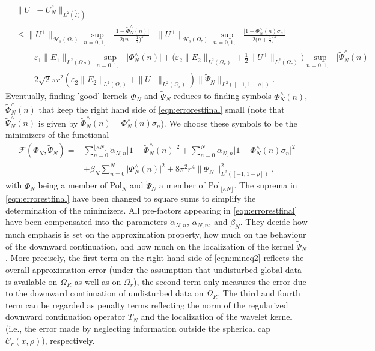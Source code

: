 \documentclass[a4paper, 10pt]{article}
\numberwithin{equation}{section}
\theoremstyle{definition}
\newcommand{\eps}{\ensuremath{\varepsilon}}
\begin{document}
\begin{align}
&\|U^+ - U_N^{\varepsilon}\|_{L^2(\tilde{\Gamma}_r)}\label{eqn:errorestfinal}
\\&\leq\|U^+\|_{\mathcal{H}_s(\Omega_r)}\sup_{n=0,1,\ldots}\frac{\big|1-\tilde{\Phi}_N^\wedge(n)\big|}{2\big(n+\frac{1}{2}\big)^s}+\|U^+\|_{\mathcal{H}_s(\Omega_r)}\sup_{n=0,1,\ldots}\frac{\big|1-{\Phi}_{N}^\wedge(n)\sigma_n\big|}{2\big(n+\frac{1}{2}\big)^s}\nonumber
\\&\quad+\varepsilon_1\|E_1\|_{L^2(\Omega_R)}\sup_{n=0,1,\ldots}\big|\Phi_{N}^\wedge(n)\big|
+\Big(\eps_2\|E_2\|_{L^2(\Omega_r)}+\frac{1}{2}\|U^+\|_{L^2(\Omega_r)}\Big)\sup_{n=0,1,\ldots}\big|\tilde{\Psi}_{N}^\wedge(n)\big|\nonumber
\\&\quad+2\sqrt{2}\pi r^2\left(\eps_2\|E_2\|_{L^2(\Omega_r)}+\|U^+\|_{L^2(\Omega_r)}\right)\big\|\tilde{\Psi}_{N}\big\|_{L^2([-1,1-\rho])}.\nonumber
\end{align}
Eventually, finding 'good' kernels $\Phi_N$ and $\tilde{\Psi}_N$ reduces to finding symbols $\Phi_N^\wedge(n)$, $\tilde{\Phi}_N^\wedge(n)$ that keep the right hand side of \eqref{eqn:errorestfinal} small (note that $\tilde{\Psi}_{N}^\wedge(n)$ is given by $\tilde{\Phi}_N^\wedge(n)-\Phi_N^\wedge(n)\sigma_n$). We choose these symbols to be the minimizers of the functional 
\begin{equation}\label{eqn:mineq2}
{\begin{aligned}
\mathcal{F}(\Phi_N,\tilde{\Psi}_N)=&\sum_{n=0}^{\lfloor\kappa N\rfloor}\tilde{\alpha}_{N,n}\big|1-\tilde{\Phi}_{N}^\wedge(n)\big|^2+\sum_{n=0}^{N}\alpha_{N,n}\big|1-{\Phi}_{N}^\wedge(n)\sigma_n\big|^2
\\&+\beta_N\sum_{n=0}^{N}\big|\Phi_N^\wedge(n)\big|^2+8\pi^2 r^4\big\|\tilde{\Psi}_N\big\|^2_{L^2([-1,1-\rho])},
\end{aligned}}
\end{equation}
with $\Phi_N$ being a member of Pol$_{N}$ and $\tilde{\Psi}_N$ a member of Pol$_{\lfloor\kappa N\rfloor}$. The suprema in \eqref{eqn:errorestfinal} have been changed to square sums to simplify the determination of the minimizers. All pre-factors appearing in \eqref{eqn:errorestfinal} have been compensated into the parameters $\tilde{\alpha}_{N,n}$, ${\alpha}_{N,n}$, and $\beta_N$. They decide how much emphasis is set on the approximation property, how much on the behaviour of the downward continuation, and how much on the localization of the kernel $\tilde{\Psi}_N$. More precisely, the first term on the right hand side of \eqref{eqn:mineq2} reflects the overall approximation error (under the assumption that undisturbed global data is available on $\Omega_R$ as well as on $\Omega_r$), the second term only measures the error due to the downward continuation of undisturbed data on $\Omega_R$. The third and fourth term can be regarded as penalty terms reflecting the norm of the regularized downward 
continuation operator $T_N$ and the localization of the wavelet kernel (i.e., the error made by neglecting information outside the spherical cap $\mathcal{C}_r(x,\rho)$), respectively.
\end{document}
